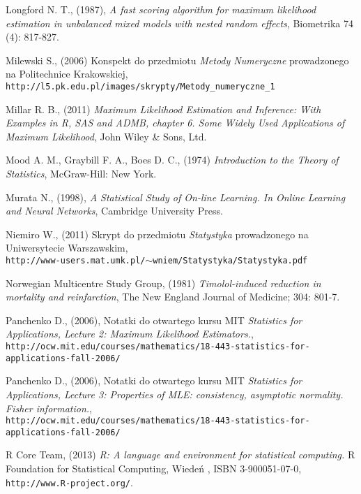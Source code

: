\begin{thebibliography}{99}
 Longford N. T., (1987), \textit{A fast scoring algorithm for maximum likelihood estimation in unbalanced mixed models with nested random effects}, Biometrika 74 (4): 817-827.

 Milewski S., (2006) Konspekt do przedmiotu \textit{Metody Numeryczne} prowadzonego na Politechnice Krakowskiej, \\ \texttt{http://l5.pk.edu.pl/images/skrypty/Metody\_numeryczne\_1}

 Millar R. B., (2011) \textit{Maximum Likelihood Estimation and Inference: With Examples in R, SAS and ADMB, chapter 6. Some Widely Used Applications of Maximum Likelihood}, John Wiley \& Sons, Ltd.

 Mood A. M., Graybill F. A., Boes D. C., (1974) \textit{Introduction to the Theory of Statistics},
McGraw-Hill: New York.

 Murata N., (1998), \textit{A Statistical Study of On-line Learning. In Online Learning
and Neural Networks}, Cambridge University Press.

 Niemiro W., (2011) Skrypt do przedmiotu \textit{Statystyka} prowadzonego na Uniwersytecie Warszawskim, \\ \texttt{http://www-users.mat.umk.pl/$\sim$wniem/Statystyka/Statystyka.pdf}

 Norwegian Multicentre Study Group, (1981) \textit{Timolol-induced reduction in
mortality and reinfarction}, The New England  Journal of Medicine; 304: 801-7.


 Panchenko D., (2006), Notatki do otwartego kursu MIT \textit{Statistics for Applications, Lecture 2: Maximum Likelihood Estimators.}, \\
\texttt{http://ocw.mit.edu/courses/mathematics/18-443-statistics-for-applications-fall-2006/}



 Panchenko D., (2006), Notatki do otwartego kursu MIT \textit{Statistics for Applications, Lecture 3: Properties of MLE: consistency, asymptotic normality. Fisher information.}, \\
\texttt{http://ocw.mit.edu/courses/mathematics/18-443-statistics-for-applications-fall-2006/}



 R Core Team, (2013) \textit{R: A language and environment for statistical computing.} R Foundation for Statistical Computing, Wiedeń , ISBN 3-900051-07-0, \texttt{http://www.R-project.org/}.



\end{thebibliography}
